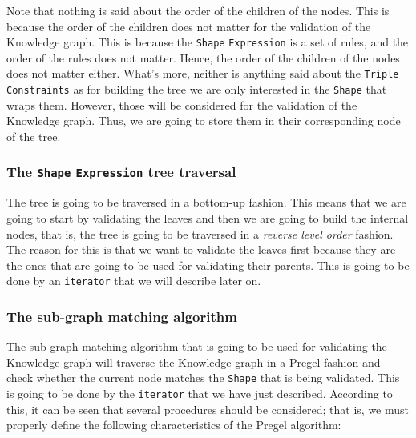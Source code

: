 \begin{example}

\end{example}

Note that nothing is said about the order of the children of the nodes. This is because the order of the children does not matter for the validation of the Knowledge graph. This is because the \texttt{Shape} \texttt{Expression} is a set of rules, and the order of the rules does not matter. Hence, the order of the children of the nodes does not matter either. What's more, neither is anything said about the \texttt{Triple Constraints} as for building the tree we are only interested in the \texttt{Shape} that wraps them. However, those will be considered for the validation of the Knowledge graph. Thus, we are going to store them in their corresponding node of the tree.

\subsubsection{The \texttt{Shape} \texttt{Expression} tree traversal}

The tree is going to be traversed in a bottom-up fashion. This means that we are going to start by validating the leaves and then we are going to build the internal nodes, that is, the tree is going to be traversed in a \textit{reverse level order} fashion. The reason for this is that we want to validate the leaves first because they are the ones that are going to be used for validating their parents. This is going to be done by an \texttt{iterator} that we will describe later on.

\subsubsection{The sub-graph matching algorithm}

The sub-graph matching algorithm that is going to be used for validating the Knowledge graph will traverse the Knowledge graph in a Pregel fashion and check whether the current node matches the \texttt{Shape} that is being validated. This is going to be done by the \texttt{iterator} that we have just described. According to this, it can be seen that several procedures should be considered; that is, we must properly define the following characteristics of the Pregel algorithm:

